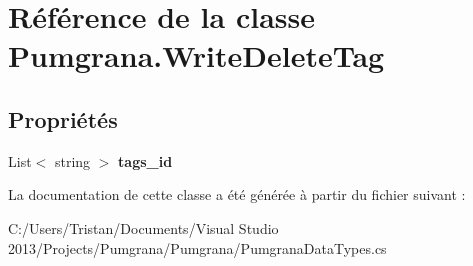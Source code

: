 \hypertarget{class_pumgrana_1_1_write_delete_tag}{\section{Référence de la classe Pumgrana.\+Write\+Delete\+Tag}
\label{class_pumgrana_1_1_write_delete_tag}
}
\subsection*{Propriétés}
\begin{DoxyCompactItemize}
\item 
\hypertarget{class_pumgrana_1_1_write_delete_tag_ae99dade7bff82cb646642d3e050508e8}{List$<$ string $>$ {\bfseries tags\+\_\+id}}\label{class_pumgrana_1_1_write_delete_tag_ae99dade7bff82cb646642d3e050508e8}

\end{DoxyCompactItemize}


La documentation de cette classe a été générée à partir du fichier suivant \+:\begin{DoxyCompactItemize}
\item 
C\+:/\+Users/\+Tristan/\+Documents/\+Visual Studio 2013/\+Projects/\+Pumgrana/\+Pumgrana/Pumgrana\+Data\+Types.\+cs\end{DoxyCompactItemize}
